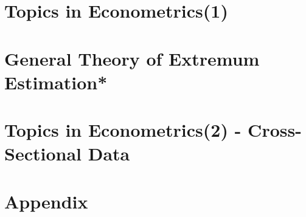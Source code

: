 \documentclass[a4paper]{report}
\begin{document}
\chapter{Topics in Econometrics(1)}

\chapter{General Theory of Extremum Estimation*}

\chapter{Topics in Econometrics(2) - Cross-Sectional Data}



\chapter*{Appendix}

\nocite{*} %


\end{document}

